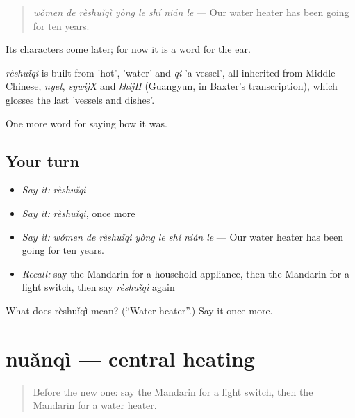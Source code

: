 \begin{quote}
\emph{wǒmen de rèshuǐqì yòng le shí nián le} — Our water heater has been going for ten years.
\end{quote}

Its characters come later; for now it is a word for the ear.

\begin{cousinweb}
\emph{rèshuǐqì} is built from  'hot',  'water' and \emph{qì} 'a vessel', all inherited from Middle Chinese, \emph{nyet}, \emph{sywijX} and \emph{khijH} (Guangyun, in Baxter's transcription), which glosses the last 'vessels and dishes'.
\end{cousinweb}

\begin{grammarlens}[title={What you've built}]
One more word for saying how it was.
\end{grammarlens}

\subsection*{Your turn}
\begin{itemize}
\raggedright
  \item \emph{Say it:} \emph{rèshuǐqì}
  \item \emph{Say it:} \emph{rèshuǐqì}, once more
  \item \emph{Say it:} \emph{wǒmen de rèshuǐqì yòng le shí nián le} — Our water heater has been going for ten years.
  \item \emph{Recall:} say the Mandarin for a household appliance, then the Mandarin for a light switch, then say \emph{rèshuǐqì} again
\end{itemize}

\begin{tcolorbox}[breakable,colback=teal!4,colframe=teal!35!black,title={Before you move on}]
What does rèshuǐqì mean? (\textquotedblleft{}Water heater\textquotedblright{}.) Say it once more.
\end{tcolorbox}
\section[nuǎnqì]{nuǎnqì — central heating}

\label{lesson:ZH-C520-nuanqi}



\begin{quote}
Before the new one: say the Mandarin for a light switch, then the Mandarin for a water heater.
\end{quote}

